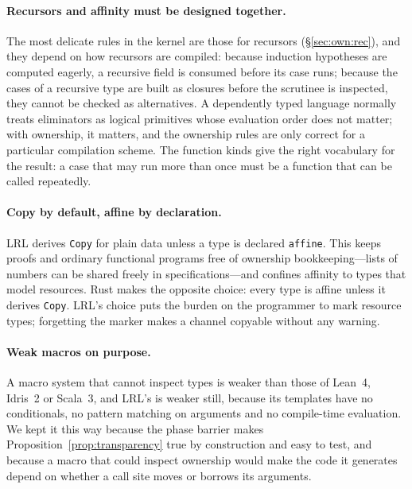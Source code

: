 \paragraph{Recursors and affinity must be designed together.}
The most delicate rules in the kernel are those for recursors (\S\ref{sec:own:rec}), and they depend on how recursors are compiled: because induction hypotheses are computed eagerly, a recursive field is consumed before its case runs; because the cases of a recursive type are built as closures before the scrutinee is inspected, they cannot be checked as alternatives.
A dependently typed language normally treats eliminators as logical primitives whose evaluation order does not matter; with ownership, it matters, and the ownership rules are only correct for a particular compilation scheme.
The function kinds give the right vocabulary for the result: a case that may run more than once must be a function that can be called repeatedly.

\paragraph{Copy by default, affine by declaration.}
LRL derives \texttt{Copy} for plain data unless a type is declared \lstinline|affine|.
This keeps proofs and ordinary functional programs free of ownership bookkeeping---lists of numbers can be shared freely in specifications---and confines affinity to types that model resources.
Rust makes the opposite choice: every type is affine unless it derives \lstinline|Copy|.
LRL's choice puts the burden on the programmer to mark resource types; forgetting the marker makes a channel copyable without any warning.

\paragraph{Weak macros on purpose.}
A macro system that cannot inspect types is weaker than those of Lean~4, Idris~2 or Scala~3, and LRL's is weaker still, because its templates have no conditionals, no pattern matching on arguments and no compile-time evaluation.
We kept it this way because the phase barrier makes Proposition~\ref{prop:transparency} true by construction and easy to test, and because a macro that could inspect ownership would make the code it generates depend on whether a call site moves or borrows its arguments.

